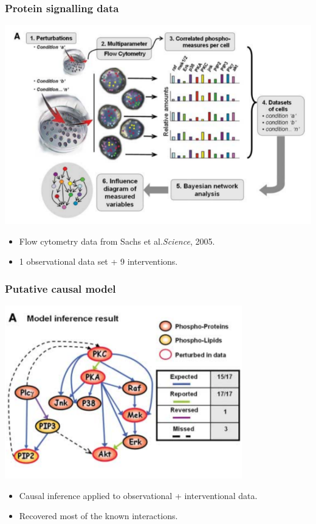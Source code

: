 \documentclass{beamer}
\begin{document}
\begin{frame}
\frametitle{Protein signalling data}
\begin{center}
\includegraphics[scale=0.3]{../images/cytoA.png}
\end{center}
\begin{itemize}
\item Flow cytometry data from Sachs et al.\emph{Science}, 2005.
\item 1 observational data set + 9 interventions.
\end{itemize}
\end{frame}

\begin{frame}
\frametitle{Putative causal model}
\begin{center}
\includegraphics[scale=0.5]{../images/cyto_result_cropped.png}
\end{center}
\begin{itemize}
\item Causal inference applied to observational + interventional data.
\item Recovered most of the known interactions.
\end{itemize}
\end{frame}
\end{document}
